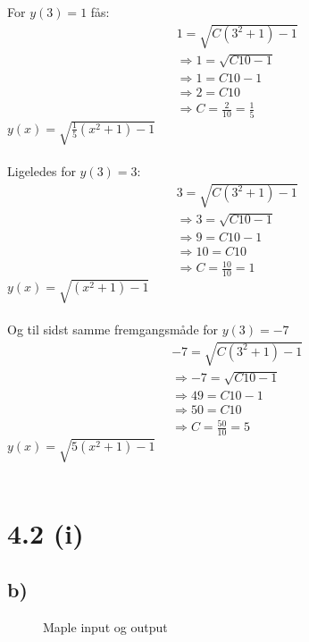 \documentclass[11pt, fleqn]{article}
\begin{document}
For $y(3)=1$ fås:
\begin{align*}
&1=\sqrt{C(3^2+1)-1} \\
& \Rightarrow 1=\sqrt{C10-1} \\
& \Rightarrow 1 = C10-1 \\
& \Rightarrow 2 = C10 \\
& \Rightarrow C = \frac{2}{10} = \frac{1}{5}
\end{align*}
%
$y(x)=\sqrt{\frac{1}{5}(x^2+1)-1}$ \\\\
%
Ligeledes for $y(3)=3$:
\begin{align*}
&3=\sqrt{C(3^2+1)-1} \\
& \Rightarrow 3=\sqrt{C10-1} \\
& \Rightarrow 9 = C10-1 \\ 
& \Rightarrow 10 = C10 \\
& \Rightarrow C = \frac{10}{10} = 1
\end{align*}
%
$y(x)=\sqrt{(x^2+1)-1}$ \\\\
%
Og til sidst samme fremgangsmåde for $y(3)=-7$
\begin{align*}
&-7=\sqrt{C(3^2+1)-1} \\
& \Rightarrow -7=\sqrt{C10-1} \\
& \Rightarrow 49=C10-1 \\
& \Rightarrow 50 = C10 \\ 
& \Rightarrow C = \frac{50}{10} = 5
\end{align*}
%
$y(x)=\sqrt{5(x^2+1)-1}$\\\\
%
\section*{4.2 (i)}

\subsection*{b)}
\begin{figure}[H]
\caption{Maple input og output }
\begin{center}
\end{center}
\end{figure}
\end{document}
